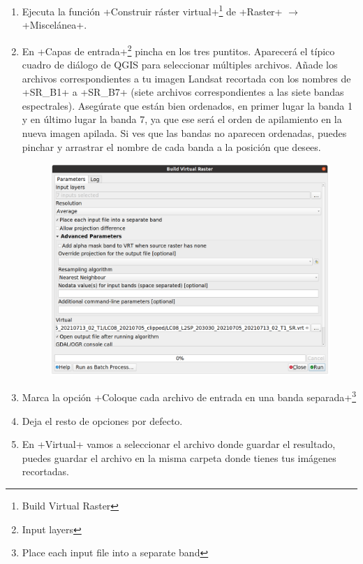 \documentclass[a4paper,11pt]{article}
\begin{document}
      \begin{enumerate}
       \item Ejecuta la función \cverb+Construir ráster virtual+\footnote{Build Virtual Raster} de \cverb+Raster+ $\rightarrow$ \cverb+Miscelánea+.
       
       \item En \cverb+Capas de entrada+\footnote{Input layers} pincha en los tres puntitos. Aparecerá el típico cuadro de diálogo de QGIS para seleccionar múltiples archivos. Añade los archivos correspondientes a tu imagen Landsat recortada con los nombres de \cverb+SR_B1+ a \cverb+SR_B7+ (siete archivos correspondientes a las siete bandas espectrales). Asegúrate que están bien ordenados, en primer lugar la banda 1 y en último lugar la banda 7, ya que ese será el orden de apilamiento en la nueva imagen apilada. Si ves que las bandas no aparecen ordenadas, puedes pinchar y arrastrar el nombre de cada banda a la posición que desees.
       
       \begin{figure}[H]\centering
        \includegraphics[width=\textwidth]{qgis_build_vrt}
       \end{figure}      
       
       \item Marca la opción \cverb+Coloque cada archivo de entrada en una banda separada+\footnote{Place each input file into a separate band}
       
       \item Deja el resto de opciones por defecto.
       
       \item En \cverb+Virtual+ vamos a seleccionar el archivo donde guardar el resultado, puedes guardar el archivo en la misma carpeta donde tienes tus imágenes recortadas. 
       

\end{enumerate}
\end{document}
